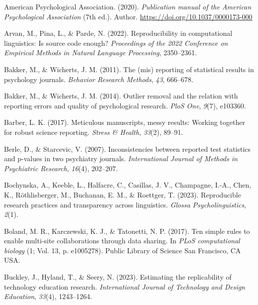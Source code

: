 \documentclass[
  doc,
  longtable,
  nolmodern,
  notxfonts,
  notimes,
  colorlinks=true,linkcolor=blue,citecolor=blue,urlcolor=blue]{apa7}
\newlength{\cslhangindent}
\newenvironment{CSLReferences}[2] %
 {\begin{list}{}{%
  \setlength{\itemindent}{0pt}
  \setlength{\leftmargin}{0pt}
  \setlength{\parsep}{0pt}
  \ifodd #1
   \setlength{\leftmargin}{\cslhangindent}
   \setlength{\itemindent}{-1\cslhangindent}
  \fi
  \setlength{\itemsep}{#2\baselineskip}}}
 {\end{list}}
\begin{document}
\label{refs}
\begin{CSLReferences}{1}{0}
American Psychological Association. (2020). \emph{Publication manual of
the {American Psychological Association}} (7th ed.). Author.
\url{https://doi.org/10.1037/0000173-000}

Arvan, M., Pina, L., \& Parde, N. (2022). Reproducibility in
computational linguistics: Is source code enough? \emph{Proceedings of
the 2022 Conference on Empirical Methods in Natural Language
Processing}, 2350--2361.

Bakker, M., \& Wicherts, J. M. (2011). The (mis) reporting of
statistical results in psychology journals. \emph{Behavior Research
Methods}, \emph{43}, 666--678.

Bakker, M., \& Wicherts, J. M. (2014). Outlier removal and the relation
with reporting errors and quality of psychological research. \emph{PloS
One}, \emph{9}(7), e103360.

Barber, L. K. (2017). Meticulous manuscripts, messy results: Working
together for robust science reporting. \emph{Stress \& Health},
\emph{33}(2), 89--91.

Berle, D., \& Starcevic, V. (2007). Inconsistencies between reported
test statistics and p-values in two psychiatry journals.
\emph{International Journal of Methods in Psychiatric Research},
\emph{16}(4), 202--207.

Bochynska, A., Keeble, L., Halfacre, C., Casillas, J. V., Champagne,
I.-A., Chen, K., Röthlisberger, M., Buchanan, E. M., \& Roettger, T.
(2023). Reproducible research practices and transparency across
linguistics. \emph{Glossa Psycholinguistics}, \emph{2}(1).

Boland, M. R., Karczewski, K. J., \& Tatonetti, N. P. (2017). Ten simple
rules to enable multi-site collaborations through data sharing. In
\emph{PLoS computational biology} (1; Vol. 13, p. e1005278). Public
Library of Science San Francisco, CA USA.

Buckley, J., Hyland, T., \& Seery, N. (2023). Estimating the
replicability of technology education research. \emph{International
Journal of Technology and Design Education}, \emph{33}(4), 1243--1264.


\end{CSLReferences}
\end{document}
